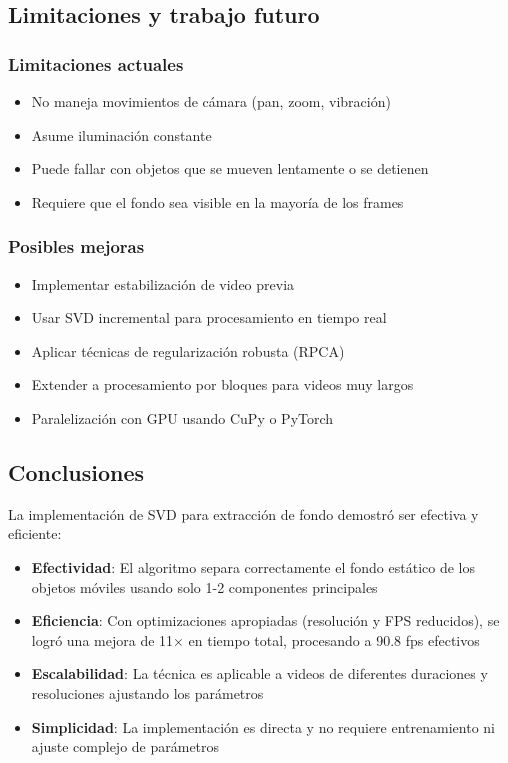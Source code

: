 \documentclass[12pt]{article}
\begin{document}
\subsection{Limitaciones y trabajo futuro}

\subsubsection{Limitaciones actuales}
\begin{itemize}
    \item No maneja movimientos de cámara (pan, zoom, vibración)
    \item Asume iluminación constante
    \item Puede fallar con objetos que se mueven lentamente o se detienen
    \item Requiere que el fondo sea visible en la mayoría de los frames
\end{itemize}

\subsubsection{Posibles mejoras}
\begin{itemize}
    \item Implementar estabilización de video previa
    \item Usar SVD incremental para procesamiento en tiempo real
    \item Aplicar técnicas de regularización robusta (RPCA)
    \item Extender a procesamiento por bloques para videos muy largos
    \item Paralelización con GPU usando CuPy o PyTorch
\end{itemize}

\subsection{Conclusiones}

La implementación de SVD para extracción de fondo demostró ser efectiva y eficiente:

\begin{itemize}
    \item \textbf{Efectividad}: El algoritmo separa correctamente el fondo estático de los objetos móviles usando solo 1-2 componentes principales
    
    \item \textbf{Eficiencia}: Con optimizaciones apropiadas (resolución y FPS reducidos), se logró una mejora de 11× en tiempo total, procesando a 90.8 fps efectivos
    
    \item \textbf{Escalabilidad}: La técnica es aplicable a videos de diferentes duraciones y resoluciones ajustando los parámetros
    
    \item \textbf{Simplicidad}: La implementación es directa y no requiere entrenamiento ni ajuste complejo de parámetros
\end{itemize}
\end{document}

